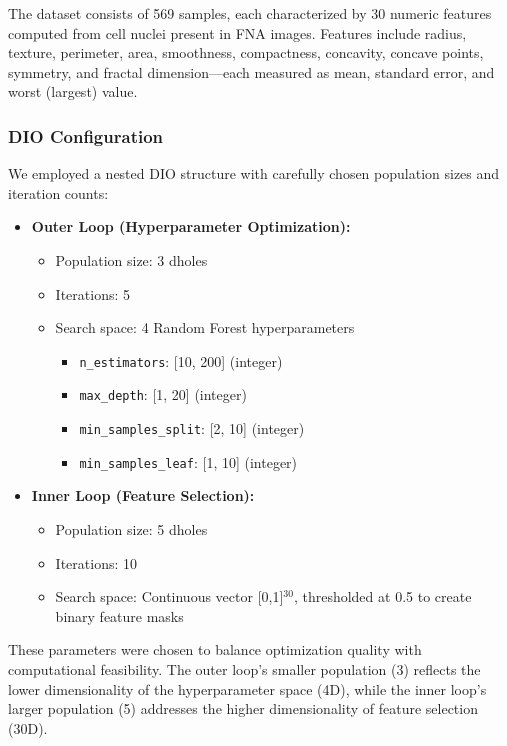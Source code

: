 \documentclass[12pt, a4paper]{article}
\begin{document}
The dataset consists of 569 samples, each characterized by 30 numeric features computed from cell nuclei present in FNA images. Features include radius, texture, perimeter, area, smoothness, compactness, concavity, concave points, symmetry, and fractal dimension—each measured as mean, standard error, and worst (largest) value.

\subsubsection{DIO Configuration}
We employed a nested DIO structure with carefully chosen population sizes and iteration counts:
\begin{itemize}
    \item \textbf{Outer Loop (Hyperparameter Optimization):}
    \begin{itemize}
        \item Population size: 3 dholes
        \item Iterations: 5
        \item Search space: 4 Random Forest hyperparameters
        \begin{itemize}
            \item \texttt{n\_estimators}: [10, 200] (integer)
            \item \texttt{max\_depth}: [1, 20] (integer)
            \item \texttt{min\_samples\_split}: [2, 10] (integer)
            \item \texttt{min\_samples\_leaf}: [1, 10] (integer)
        \end{itemize}
    \end{itemize}
    
    \item \textbf{Inner Loop (Feature Selection):}
    \begin{itemize}
        \item Population size: 5 dholes
        \item Iterations: 10
        \item Search space: Continuous vector [0,1]$^{30}$, thresholded at 0.5 to create binary feature masks
    \end{itemize}
\end{itemize}

These parameters were chosen to balance optimization quality with computational feasibility. The outer loop's smaller population (3) reflects the lower dimensionality of the hyperparameter space (4D), while the inner loop's larger population (5) addresses the higher dimensionality of feature selection (30D).
\end{document}

